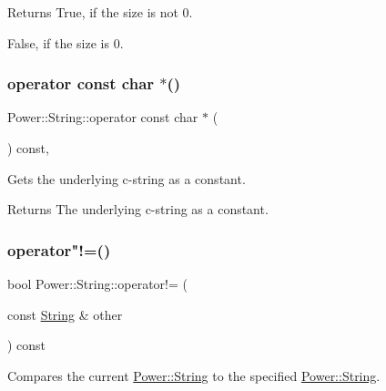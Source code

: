 \begin{DoxyReturn}{Returns}
True, if the size is not 0. 

False, if the size is 0. 
\end{DoxyReturn}
\mbox{\label{class_power_1_1_string_acf417d8914b4ae725691e8cd08b2911a}} 
\subsubsection{\texorpdfstring{operator const char $\ast$()}{operator const char *()}}
{\footnotesize\ttfamily Power\+::\+String\+::operator const char $\ast$ (\begin{DoxyParamCaption}{ }\end{DoxyParamCaption}) const\hspace{0.3cm}{\ttfamily [inline]}, {\ttfamily [explicit]}}



Gets the underlying c-\/string as a constant. 

\begin{DoxyReturn}{Returns}
The underlying c-\/string as a constant. 
\end{DoxyReturn}
\mbox{\label{class_power_1_1_string_a554a6ff1a319237b53d978ed3ef18f07}} 
\subsubsection{\texorpdfstring{operator"!=()}{operator!=()}\hspace{0.1cm}{\footnotesize\ttfamily [1/3]}}
{\footnotesize\ttfamily bool Power\+::\+String\+::operator!= (\begin{DoxyParamCaption}\item[{const \hyperlink{class_power_1_1_string}{String} \&}]{other }\end{DoxyParamCaption}) const\hspace{0.3cm}{\ttfamily [inline]}}



Compares the current \hyperlink{class_power_1_1_string}{Power\+::\+String} to the specified \hyperlink{class_power_1_1_string}{Power\+::\+String}. 


